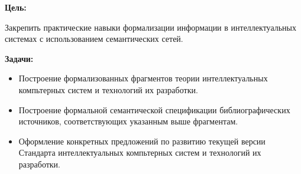 
\textbf{Цель:}

Закрепить практические навыки формализации информации в интеллектуальных системах с использованием семантических сетей.
\bigskip

\textbf{Задачи:}

\begin{itemize}
    \item Построение формализованных фрагментов теории интеллектуальных компьтерных систем и технологий их разработки.
    \item Построение формальной семантической спецификации библиографических источников, соответствующих указанным выше фрагментам.
    \item Оформление конкретных предложений по развитию текущей версии Стандарта интеллектуальных компьтерных систем и технологий их разработки.
\end{itemize}